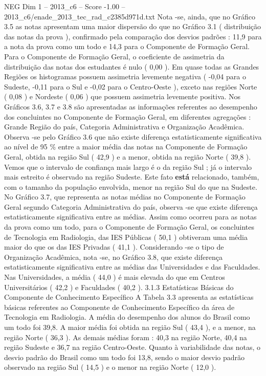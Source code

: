 \begin{textsample}{NEG Dim 1 – 2013\_c6 – Score -1.00 – 2013\_c6/enade\_2013\_tec\_rad\_c2385d971d.txt}
Nota -se, ainda, que no Gráfico 3.5 as notas apresentam uma maior dispersão do que no Gráfico 3.1 ( distribuição das notas da prova ), confirmado pela comparação dos desvios padrões : 11,9 para a nota da prova como um todo e 14,3 para o Componente de Formação Geral.
Para o Componente de Formação Geral, o coeficiente de assimetria da distribuição das notas dos estudantes é nulo ( 0,00 ).
Em quase todas as Grandes Regiões os histogramas possuem assimetria levemente negativa ( -0,04 para o Sudeste, -0,11 para o Sul e -0,02 para o Centro-Oeste ), exceto nas regiões Norte ( 0,08 ) e Nordeste ( 0,06 ) que possuem assimetria levemente positiva.
Nos Gráficos 3.6, 3.7 e 3.8 são apresentadas as informações referentes ao desempenho dos concluintes no Componente de Formação Geral, em diferentes agregações : Grande Região do país, Categoria Administrativa e Organização Acadêmica.
Observa -se pelo Gráfico 3.6 que não existe diferença estatisticamente significativa ao nível de 95 \% entre a maior média das notas na Componente de Formação Geral, obtida na região Sul ( 42,9 ) e a menor, obtida na região Norte ( 39,8 ).
Vemos que o intervalo de confiança mais largo é o da região Sul ; já o intervalo mais estreito é observado na região Sudeste.
Este fato \textbf{está} relacionado, também, com o tamanho da população envolvida, menor na região Sul do que na Sudeste.
No Gráfico 3.7, que representa as notas médias no Componente de Formação Geral segundo Categoria Administrativa do país, observa -se que existe diferença estatisticamente significativa entre as médias.
Assim como ocorreu para as notas da prova como um todo, para o Componente de Formação Geral, os concluintes de Tecnologia em Radiologia, das IES Públicas ( 50,1 ) obtiveram uma média maior do que os das IES Privadas ( 41,1 ).
Considerando -se o tipo de Organização Acadêmica, nota -se, no Gráfico 3.8, que existe diferença estatisticamente significativa entre as médias das Universidades e das Faculdades.
Nas Universidades, a média ( 44,0 ) é mais elevada do que em Centros Universitários ( 42,2 ) e Faculdades ( 40,2 ). 3.1.3 Estatísticas Básicas do Componente de Conhecimento Específico A Tabela 3.3 apresenta as estatísticas básicas referentes ao Componente de Conhecimento Específico da área de Tecnologia em Radiologia.
A média do desempenho dos alunos do Brasil como um todo foi 39,8.
A maior média foi obtida na região Sul ( 43,4 ), e a menor, na região Norte ( 36,3 ).
As demais médias foram : 40,3 na região Norte, 40,4 na região Sudeste e 36,7 na região Centro-Oeste.
Quanto à variabilidade das notas, o desvio padrão do Brasil como um todo foi 13,8, sendo o maior desvio padrão observado na região Sul ( 14,5 ) e o menor na região Norte ( 12,0 ).

\end{textsample}
